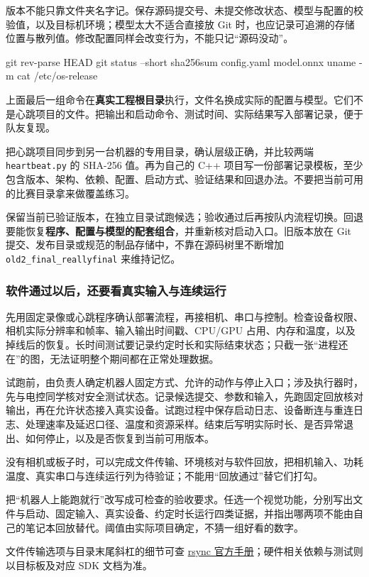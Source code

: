 版本不能只靠文件夹名字记。保存源码提交号、未提交修改状态、模型与配置的校验值，以及目标机环境；模型太大不适合直接放 Git 时，也应记录可追溯的存储位置与散列值。修改配置同样会改变行为，不能只记“源码没动”。

\begin{tbash}
git rev-parse HEAD
git status --short
sha256sum config.yaml model.onnx
uname -m
cat /etc/os-release
\end{tbash}
上面最后一组命令在\textbf{真实工程根目录}执行，文件名换成实际的配置与模型。它们不是心跳项目的文件。把输出和启动命令、测试时间、实际结果写入部署记录，便于队友复现。

\begin{exercise}\label{ex:deploy-delivery}
把心跳项目同步到另一台机器的专用目录，确认层级正确，并比较两端 \texttt{heartbeat.py} 的 SHA-256 值。再为自己的 C++ 项目写一份部署记录模板，至少包含版本、架构、依赖、配置、启动方式、验证结果和回退办法。不要把当前可用的比赛目录拿来做覆盖练习。
\end{exercise}

\begin{conclusion}
保留当前已验证版本，在独立目录试跑候选；验收通过后再按队内流程切换。回退要能恢复\textbf{程序、配置与模型的配套组合}，并重新核对启动入口。旧版本放在 Git 提交、发布目录或规范的制品存储中，不靠在源码树里不断增加 \texttt{old2\_final\_reallyfinal} 来维持记忆。
\end{conclusion}

\subsubsection{软件通过以后，还要看真实输入与连续运行}

先用固定录像或心跳程序确认部署流程，再接相机、串口与控制。检查设备权限、相机实际分辨率和帧率、输入输出时间戳、CPU/GPU 占用、内存和温度，以及掉线后的恢复。长时间测试要记录约定时长和实际结束状态；只截一张“进程还在”的图，无法证明整个期间都在正常处理数据。

\begin{example}[给一次板端试跑写清证据]
试跑前，由负责人确定机器人固定方式、允许的动作与停止入口；涉及执行器时，先与电控同学核对安全测试状态。记录候选提交、参数和输入，先跑固定回放核对输出，再在允许状态接入真实设备。试跑过程中保存启动日志、设备断连与重连日志、处理速率及延迟口径、温度和资源采样。结束后写明实际时长、是否异常退出、如何停止，以及是否恢复到当前可用版本。

没有相机或板子时，可以完成文件传输、环境核对与软件回放，把相机输入、功耗温度、真实串口与连续运行列为待验证；不能用“回放通过”替它们打勾。
\end{example}

\begin{exercise}\label{ex:deploy-acceptance}
把“机器人上能跑就行”改写成可检查的验收要求。任选一个视觉功能，分别写出文件与启动、固定输入、真实设备、约定时长运行四类证据，并指出哪两项不能由自己的笔记本回放替代。阈值由实际项目确定，不猜一组好看的数字。
\end{exercise}

文件传输选项与目录末尾斜杠的细节可查 \href{https://download.samba.org/pub/rsync/rsync.1}{rsync 官方手册}；硬件相关依赖与测试则以目标板及对应 SDK 文档为准。
